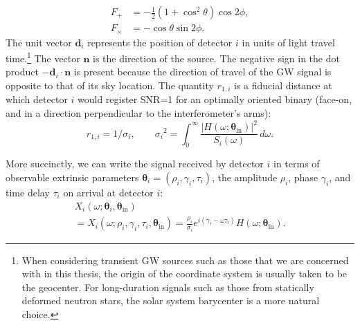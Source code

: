 \documentclass[amsmath,amssymb,aps,prx,reprint,nopreprintnumbers,nofootinbib,showpacs]{revtex4-1}
\begin{document}
%
\begin{align}
    F_+ &= -\frac{1}{2}(1 + \cos^2 \theta) \cos{2\phi}, \\
    F_\times &= -\cos\theta \sin{2\phi}.
\end{align}
%
The unit vector $\mathbf{d}_i$ represents the position of detector $i$ in units of light travel time.\footnote{When considering transient \ac{GW} sources such as those that we are concerned with in this thesis, the origin of the coordinate system is usually taken to be the geocenter. For long\nobreakdashes-duration signals such as those from statically deformed neutron stars, the solar system barycenter is a more natural choice.} The vector $\mathbf{n}$ is the direction of the source. The negative sign in the dot product $-\mathbf{d}_i \cdot \mathbf{n}$ is present because the direction of travel of the \ac{GW} signal is opposite to that of its sky location. The quantity $r_{1,i}$ is a fiducial distance at which detector $i$ would register SNR=1 for an optimally oriented binary (face\nobreakdashes-on, and in a direction perpendicular to the interferometer's arms):
%
\begin{equation}\label{eq:horizon}
r_{1,i} = 1 / \sigma_i, \qquad {\sigma_i}^2 = \int_0^\infty \frac{\left|H(\omega; \boldsymbol \theta_\mathrm{in})\right|^2}{S_i(\omega)} \,d\omega.
\end{equation}

More succinctly, we can write the signal received by detector $i$ in terms of observable extrinsic parameters $\bm\theta_i = (\rho_i, \gamma_i, \tau_i)$, the amplitude $\rho_i$, phase $\gamma_i$, and time delay $\tau_i$ on arrival at detector $i$:
%
\begin{multline}\label{eq:signal-model}
    X_i (\omega; \bm\theta_i, \bm\theta_\mathrm{in})
    \\
    = X_i (\omega; \rho_i, \gamma_i, \tau_i, \bm\theta_\mathrm{in}) = \frac{\rho_i}{\sigma_i} e^{i (\gamma_i - \omega \tau_i)} H(\omega; \bm\theta_\mathrm{in}).
\end{multline}
\end{document}

